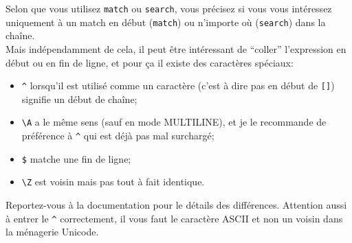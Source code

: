     Selon que vous utilisez \texttt{match} ou \texttt{search}, vous précisez
si vous vous intéressez uniquement à un match en début (\texttt{match})
ou n'importe où (\texttt{search}) dans la chaîne.\\

Mais indépendamment de cela, il peut être intéressant de ``coller''
l'expression en début ou en fin de ligne, et pour ça il existe des
caractères spéciaux:

\begin{itemize}
	\item
	\texttt{\^{}} lorsqu'il est utilisé comme un
	caractère (c'est à dire pas en début de \texttt{{[}{]}}) signifie un
	début de chaîne;
	\item
	\texttt{\textbackslash{}A} a le même sens (sauf en
	mode MULTILINE), et je le recommande de préférence à \texttt{\^{}} qui
	est déjà pas mal surchargé;
	\item
	\texttt{\$} matche une fin de ligne;
	\item
	\texttt{\textbackslash{}Z} est voisin mais pas tout à fait identique.
\end{itemize}

Reportez-vous à la documentation pour le détails des différences.
Attention aussi à entrer le \texttt{\^{}} correctement, il vous faut le
caractère ASCII et non un voisin dans la ménagerie Unicode.

